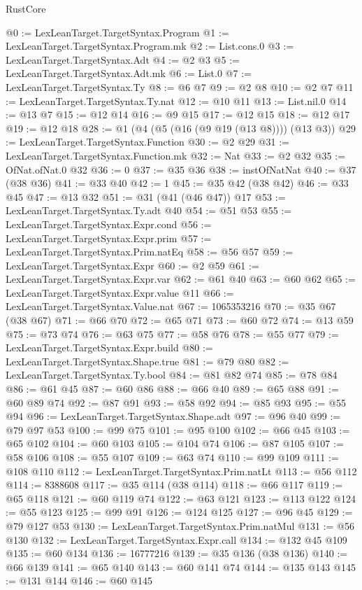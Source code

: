 \begin{lexlean}{RustCore}
\begin{coremodule}
@0 := LexLeanTarget.TargetSyntax.Program
@1 := LexLeanTarget.TargetSyntax.Program.mk
@2 := List.cons.{0}
@3 := LexLeanTarget.TargetSyntax.Adt
@4 := @2 @3
@5 := LexLeanTarget.TargetSyntax.Adt.mk
@6 := List.{0}
@7 := LexLeanTarget.TargetSyntax.Ty
@8 := @6 @7
@9 := @2 @8
@10 := @2 @7
@11 := LexLeanTarget.TargetSyntax.Ty.nat
@12 := @10 @11
@13 := List.nil.{0}
@14 := @13 @7
@15 := @12 @14
@16 := @9 @15
@17 := @12 @15
@18 := @12 @17
@19 := @12 @18
@28 := @1 (@4 (@5 (@16 (@9 @19 (@13 @8)))) (@13 @3))
@29 := LexLeanTarget.TargetSyntax.Function
@30 := @2 @29
@31 := LexLeanTarget.TargetSyntax.Function.mk
@32 := Nat
@33 := @2 @32
@35 := OfNat.ofNat.{0} @32
@36 := 0
@37 := @35 @36
@38 := instOfNatNat
@40 := @37 (@38 @36)
@41 := @33 @40
@42 := 1
@45 := @35 @42 (@38 @42)
@46 := @33 @45
@47 := @13 @32
@51 := @31 (@41 (@46 @47)) @17
@53 := LexLeanTarget.TargetSyntax.Ty.adt @40
@54 := @51 @53
@55 := LexLeanTarget.TargetSyntax.Expr.cond
@56 := LexLeanTarget.TargetSyntax.Expr.prim
@57 := LexLeanTarget.TargetSyntax.Prim.natEq
@58 := @56 @57
@59 := LexLeanTarget.TargetSyntax.Expr
@60 := @2 @59
@61 := LexLeanTarget.TargetSyntax.Expr.var
@62 := @61 @40
@63 := @60 @62
@65 := LexLeanTarget.TargetSyntax.Expr.value @11
@66 := LexLeanTarget.TargetSyntax.Value.nat
@67 := 1065353216
@70 := @35 @67 (@38 @67)
@71 := @66 @70
@72 := @65 @71
@73 := @60 @72
@74 := @13 @59
@75 := @73 @74
@76 := @63 @75
@77 := @58 @76
@78 := @55 @77
@79 := LexLeanTarget.TargetSyntax.Expr.build
@80 := LexLeanTarget.TargetSyntax.Shape.true
@81 := @79 @80
@82 := LexLeanTarget.TargetSyntax.Ty.bool
@84 := @81 @82 @74
@85 := @78 @84
@86 := @61 @45
@87 := @60 @86
@88 := @66 @40
@89 := @65 @88
@91 := @60 @89 @74
@92 := @87 @91
@93 := @58 @92
@94 := @85 @93
@95 := @55 @94
@96 := LexLeanTarget.TargetSyntax.Shape.adt
@97 := @96 @40
@99 := @79 @97 @53
@100 := @99 @75
@101 := @95 @100
@102 := @66 @45
@103 := @65 @102
@104 := @60 @103
@105 := @104 @74
@106 := @87 @105
@107 := @58 @106
@108 := @55 @107
@109 := @63 @74
@110 := @99 @109
@111 := @108 @110
@112 := LexLeanTarget.TargetSyntax.Prim.natLt
@113 := @56 @112
@114 := 8388608
@117 := @35 @114 (@38 @114)
@118 := @66 @117
@119 := @65 @118
@121 := @60 @119 @74
@122 := @63 @121
@123 := @113 @122
@124 := @55 @123
@125 := @99 @91
@126 := @124 @125
@127 := @96 @45
@129 := @79 @127 @53
@130 := LexLeanTarget.TargetSyntax.Prim.natMul
@131 := @56 @130
@132 := LexLeanTarget.TargetSyntax.Expr.call
@134 := @132 @45 @109
@135 := @60 @134
@136 := 16777216
@139 := @35 @136 (@38 @136)
@140 := @66 @139
@141 := @65 @140
@143 := @60 @141 @74
@144 := @135 @143
@145 := @131 @144
@146 := @60 @145

\end{coremodule}
\end{lexlean}
